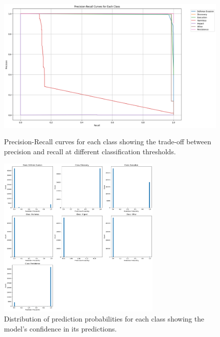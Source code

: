        \begin{figure}[h]
            \centering
            \begin{minipage}[c]{0.47\textwidth}
                \centering
                \vspace{0.7cm}
                \includegraphics[width=\textwidth]{../figures/plots/section4/precision_recall_curves.png}
                \vspace{0.15cm}
                \caption{Precision-Recall curves for each class showing the trade-off between precision and recall at different classification thresholds.}
                \label{fig:pr_curves}
            \end{minipage}
            \hfill
            \begin{minipage}[c]{0.47\textwidth}
                \centering
                \includegraphics[width=0.7\textwidth]{../figures/plots/section4/probability_histograms.png}
                \caption{Distribution of prediction probabilities for each class showing the model's confidence in its predictions.}
                \label{fig:pred_prob} 
            \end{minipage}
        \end{figure}
        
